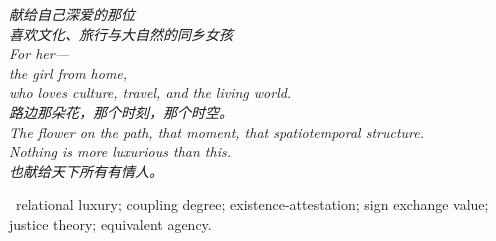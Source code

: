 
\thispagestyle{empty}
\null\vfill
\begin{center}
\begin{minipage}{0.72\linewidth}
\centering\itshape\color{rose}
{\cjk 献给自己深爱的那位}\\[0.4em]
{\cjk 喜欢文化、旅行与大自然的同乡女孩}\\[0.8em]
For her---\\[0.3em]
the girl from home,\\[0.2em]
who loves culture, travel, and the living world.\\[1.0em]
{\cjk 路边那朵花，那个时刻，那个时空。}\\[0.3em]
\textit{The flower on the path, that moment, that spatiotemporal structure.}\\[0.3em]
\textit{Nothing is more luxurious than this.}\\[1.0em]
{\upshape\footnotesize\color{gold} {\cjk 也献给天下所有有情人。}}
\end{minipage}
\end{center}
\vfill\null
\clearpage



\vspace{1.2em}
\, \textcolor{inksoft}{relational luxury; coupling degree; existence-attestation; sign exchange value; justice theory; equivalent agency.}
\newpage

\newpage















